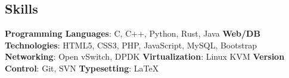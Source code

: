 \documentclass[../main.tex]{subfiles}
\begin{document}
\begin{category}
\section{Skills}
    \citembullet \textbf{Programming Languages}: C, C++, Python, Rust, Java
    \citembullet \textbf{Web/DB Technologies}: HTML5, CSS3, PHP, JavaScript, MySQL, Bootstrap
    \citembullet \textbf{Networking}: Open vSwitch, DPDK
    \citembullet \textbf{Virtualization}: Linux KVM
    \citembullet \textbf{Version Control}: Git, SVN
    \citembullet \textbf{Typesetting}: \LaTeX 
    \\[-12pt]
\end{category}
\end{document}
